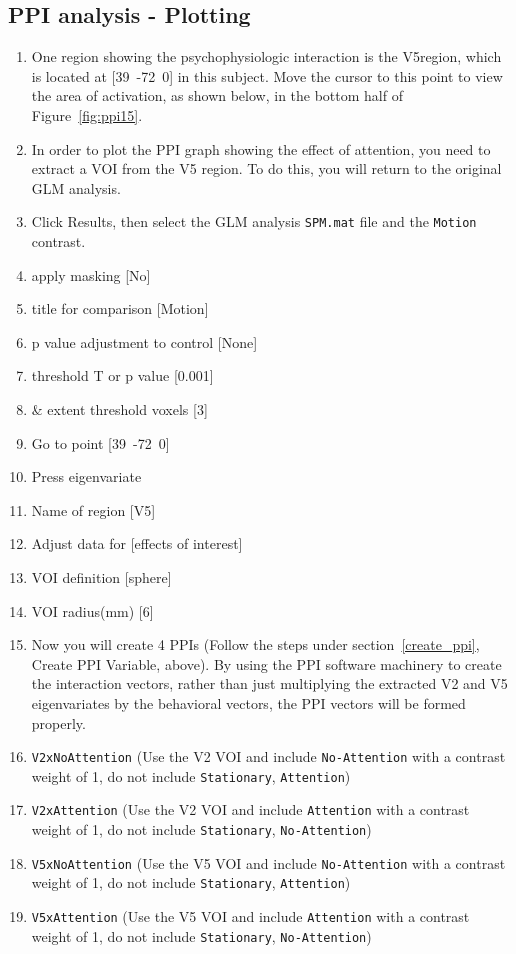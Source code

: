 \subsection{PPI analysis - Plotting}
\begin{enumerate}
\item One region showing the psychophysiologic interaction is the V5region, which is located at [39~-72~0] in this subject. Move the cursor to this point to view the area of activation, as shown below, in the bottom half of Figure~\ref{fig:ppi15}.

\item In order to plot the PPI graph showing the effect of attention, you need to extract a VOI from the V5 region. To do this, you will return to the original GLM analysis.
\item Click Results, then select the GLM analysis \texttt{SPM.mat} file and the \texttt{Motion} contrast.
\item apply masking [No]
\item title for comparison [Motion]
\item p value adjustment to control [None]
\item threshold {T or p value} [0.001]
\item \& extent threshold {voxels} [3]
\item Go to point [39~-72~0]
\item Press eigenvariate
\item Name of region [V5]
\item Adjust data for [effects of interest]
\item VOI definition [sphere]
\item VOI radius(mm) [6]
\item Now you will create 4 PPIs (Follow the steps under section~\ref{create_ppi}, Create PPI Variable, above). By using the PPI software machinery to create the interaction vectors, rather than just multiplying the extracted V2 and V5 eigenvariates by the behavioral vectors, the PPI vectors will be formed properly.

\item \texttt{V2xNoAttention} (Use the V2 VOI and include \texttt{No-Attention} with a contrast weight of 1, do not include \texttt{Stationary}, \texttt{Attention})
\item \texttt{V2xAttention} (Use the V2 VOI and include \texttt{Attention} with a contrast weight of 1, do not include \texttt{Stationary}, \texttt{No-Attention})
\item \texttt{V5xNoAttention} (Use the V5 VOI and include \texttt{No-Attention} with a contrast weight of 1, do not include \texttt{Stationary}, \texttt{Attention})
\item \texttt{V5xAttention} (Use the V5 VOI and include \texttt{Attention} with a contrast weight of 1, do not include \texttt{Stationary}, \texttt{No-Attention})


\end{enumerate}
